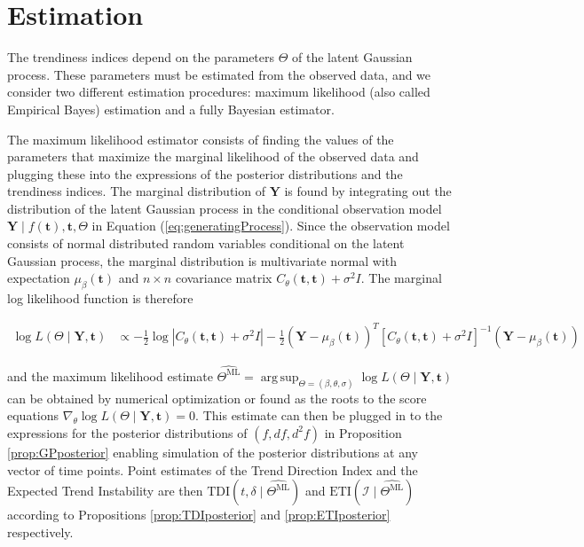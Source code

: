 \documentclass[11pt,]{article}
\DeclareMathOperator*{\argsup}{arg\,sup}
\theoremstyle{nonumberplain}
\begin{document}
\section{Estimation}\label{sec:estimation}

The trendiness indices depend on the parameters \(\Theta\) of the latent
Gaussian process. These parameters must be estimated from the observed
data, and we consider two different estimation procedures: maximum
likelihood (also called Empirical Bayes) estimation and a fully Bayesian
estimator.

The maximum likelihood estimator consists of finding the values of the
parameters that maximize the marginal likelihood of the observed data
and plugging these into the expressions of the posterior distributions
and the trendiness indices. The marginal distribution of \(\mathbf{Y}\)
is found by integrating out the distribution of the latent Gaussian
process in the conditional observation model
\(\mathbf{Y} \mid f(\mathbf{t}), \mathbf{t}, \Theta\) in Equation
(\ref{eq:generatingProcess}). Since the observation model consists of
normal distributed random variables conditional on the latent Gaussian
process, the marginal distribution is multivariate normal with
expectation \(\mu_\beta(\mathbf{t})\) and \(n \times n\) covariance
matrix \(C_\theta(\mathbf{t}, \mathbf{t}) + \sigma^2 I\). The marginal
log likelihood function is therefore

\begin{align}
\log L(\Theta \mid \mathbf{Y}, \mathbf{t}) &\propto - \frac{1}{2}\log |C_{\theta}(\mathbf{t}, \mathbf{t}) + \sigma^2 I| - \frac{1}{2}(\mathbf{Y} - \mu_\beta(\mathbf{t}))^T\left[C_{\theta}(\mathbf{t}, \mathbf{t}) + \sigma^2 I\right]^{-1}(\mathbf{Y} - \mu_\beta(\mathbf{t}))\label{eq:margloglik}
\end{align}

and the maximum likelihood estimate
\(\widehat{\Theta^\text{ML}} = \argsup_{\Theta = (\beta, \theta, \sigma)} \log L(\Theta \mid \mathbf{Y}, \mathbf{t})\)
can be obtained by numerical optimization or found as the roots to the
score equations
\(\nabla_\theta \log L(\Theta \mid \mathbf{Y}, \mathbf{t}) = 0\). This
estimate can then be plugged in to the expressions for the posterior
distributions of \((f, df, d^2\!f)\) in Proposition
\ref{prop:GPposterior} enabling simulation of the posterior
distributions at any vector of time points. Point estimates of the Trend
Direction Index and the Expected Trend Instability are then
\(\mathrm{TDI}(t, \delta \mid \widehat{\Theta^\text{ML}})\) and
\(\mathrm{ETI}(\mathcal{I} \mid \widehat{\Theta^\text{ML}})\) according
to Propositions \ref{prop:TDIposterior} and \ref{prop:ETIposterior}
respectively.
\end{document}
